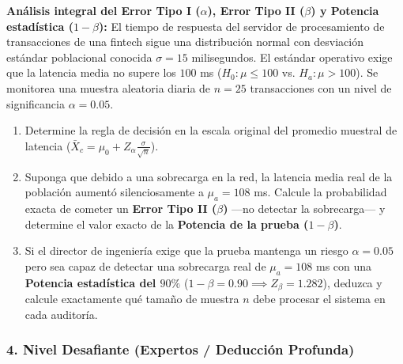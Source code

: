\begin{problema}
	\label{prob:doc_errores_potencia_muestra}
	\textbf{Análisis integral del Error Tipo I ($\alpha$), Error Tipo II ($\beta$) y Potencia estadística ($1-\beta$):}
	El tiempo de respuesta del servidor de procesamiento de transacciones de una fintech sigue una distribución normal con desviación estándar poblacional conocida $\sigma = 15$ milisegundos. El estándar operativo exige que la latencia media no supere los $100$ ms ($H_0: \mu \le 100$ vs. $H_a: \mu > 100$). Se monitorea una muestra aleatoria diaria de $n = 25$ transacciones con un nivel de significancia $\alpha = 0.05$.
	\begin{enumerate}
		\item Determine la regla de decisión en la escala original del promedio muestral de latencia ($\bar{X}_c = \mu_0 + Z_\alpha \frac{\sigma}{\sqrt{n}}$).
		\item Suponga que debido a una sobrecarga en la red, la latencia media real de la población aumentó silenciosamente a $\mu_a = 108$ ms. Calcule la probabilidad exacta de cometer un \textbf{Error Tipo II ($\beta$)} —no detectar la sobrecarga— y determine el valor exacto de la \textbf{Potencia de la prueba ($1-\beta$)}.
		\item Si el director de ingeniería exige que la prueba mantenga un riesgo $\alpha = 0.05$ pero sea capaz de detectar una sobrecarga real de $\mu_a = 108$ ms con una \textbf{Potencia estadística del $90\%$} ($1-\beta = 0.90 \implies Z_\beta = 1.282$), deduzca y calcule exactamente qué tamaño de muestra $n$ debe procesar el sistema en cada auditoría.
	\end{enumerate}
\end{problema}

\subsubsection*{4. Nivel Desafiante (Expertos / Deducción Profunda)}

